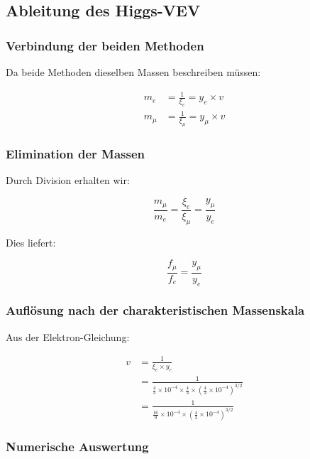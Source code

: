 \documentclass[12pt,a4paper]{article}
\begin{document}
\subsection{Ableitung des Higgs-VEV}

\subsubsection{Verbindung der beiden Methoden}

Da beide Methoden dieselben Massen beschreiben müssen:

\begin{align}
	m_e &= \frac{1}{\xi_e} = y_e \times v\\
	m_\mu &= \frac{1}{\xi_\mu} = y_\mu \times v
\end{align}

\subsubsection{Elimination der Massen}

Durch Division erhalten wir:

\begin{equation}
	\frac{m_\mu}{m_e} = \frac{\xi_e}{\xi_\mu} = \frac{y_\mu}{y_e}
\end{equation}

Dies liefert:

\begin{equation}
	\frac{f_\mu}{f_e} = \frac{y_\mu}{y_e}
\end{equation}

\subsubsection{Auflösung nach der charakteristischen Massenskala}

Aus der Elektron-Gleichung:

\begin{align}
	v &= \frac{1}{\xi_e \times y_e}\\
	&= \frac{1}{\frac{4}{3} \times 10^{-4} \times \frac{4}{3} \times \left(\frac{4}{3} \times 10^{-4}\right)^{3/2}}\\
	&= \frac{1}{\frac{16}{9} \times 10^{-4} \times \left(\frac{4}{3} \times 10^{-4}\right)^{3/2}}
\end{align}

\subsubsection{Numerische Auswertung}
\end{document}
